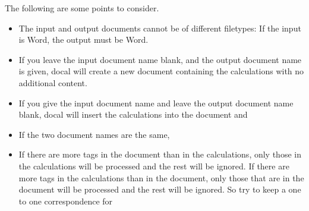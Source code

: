 \documentclass[12pt]{article}
\begin{document}
The following are some points to consider.
\begin{itemize}
    \setlength\itemsep{0pt}
    \item The input and output documents cannot be of different filetypes: If
        the input is Word, the output must be Word.
    \item If you leave the input document name blank, and the output document
        name is given, docal will create a new document containing the
        calculations with no additional content.
    \item If you give the input document name and leave the output document
        name blank, docal will insert the calculations into the document and
    \item If the two document names are the same,
    \item If there are more tags in the document than in the calculations, only
        those in the calculations will be processed and the rest will be
        ignored. If there are more tags in the calculations than in the
        document, only those that are in the document will be processed and the
        rest will be ignored. So try to keep a one to one correspondence for

\end{itemize}
\end{document}
